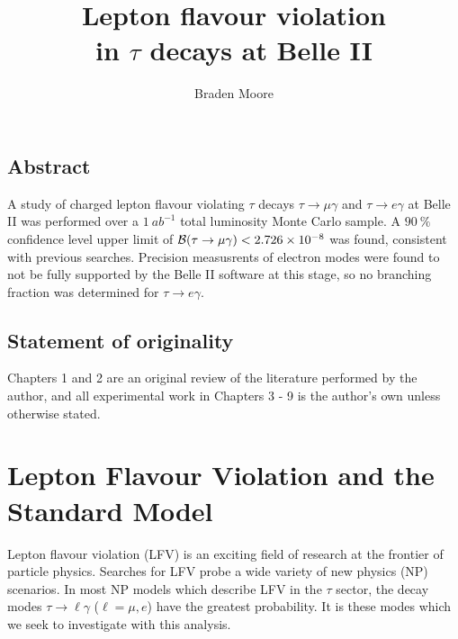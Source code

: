 \documentclass[12pt]{thesis}  %
\title{Lepton flavour violation\\in $\tau$ decays at Belle II }   %
\author{Braden Moore}             %
\begin{document}
\baselineskip=14pt 

\setcounter{secnumdepth}{3}
\setcounter{tocdepth}{3}

\pagestyle{empty}
\maketitle                  %


\pagestyle{plain}
\begin{romanpages}
\tableofcontents

\chapter*{Abstract}

A study of charged lepton flavour violating $\tau$ decays $\tau\to\mu\gamma$ and $\tau\to e\gamma$ at Belle II was performed over a $\SI{1}{ab^{-1}}$ total luminosity Monte Carlo sample. A $\SI{90}{\percent}$ confidence level upper limit of $\mathcal{B}(\tau\to\mu\gamma)<\num{2.726d-8}$ was found, consistent with previous searches. Precision measusrents of electron modes were found to not be fully supported by the Belle II software at this stage, so no branching fraction was determined for $\tau\to e\gamma$.

\section*{Statement of originality}

Chapters 1 and 2 are an original review of the literature performed by the author, and all experimental work in Chapters 3 - 9 is the author's own unless otherwise stated.

\end{romanpages}


\chapter{Lepton Flavour Violation and the Standard Model}

Lepton flavour violation (LFV) is an exciting field of research at the frontier of particle physics. Searches for LFV probe a wide variety of new physics (NP) scenarios. In most NP models which describe LFV in the $\tau$ sector, the decay modes $\tau\to\ell\gamma$ ($\ell=\mu,e$) have the greatest probability\cite{Paradisi:2016}. It is these modes which we seek to investigate with this analysis.
\end{document}
